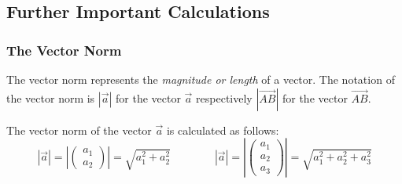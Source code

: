 \documentclass[12pt,eng]{skript_ogg}
\begin{document}
\subsection{Further Important Calculations}
\subsubsection{The Vector Norm}
The vector norm represents the \emph{magnitude or length} of a vector. The notation of the vector norm is $|\vec{a}|$ for the vector $\vec{a}$ respectively $|\overrightarrow{AB}|$ for the vector $\overrightarrow{AB}$.

\begin{satz}
The vector norm of the vector $\vec{a}$ is calculated as follows:
\[|\vec{a}|=\left|\begin{pmatrix}a_1\\a_2\end{pmatrix}\right|=\sqrt{a_1^2+a_2^2}\qquad\qquad|\vec{a}|=\left|\begin{pmatrix}a_1\\a_2\\a_3\end{pmatrix}\right|=\sqrt{a_1^2+a_2^2+a_3^2}\]
\end{satz}
\end{document}
